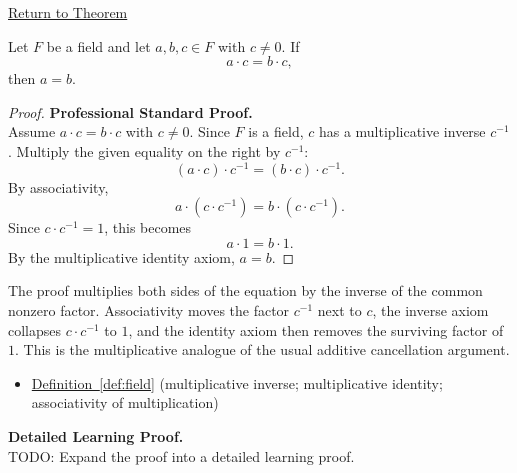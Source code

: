 \newpage
{}
\label{prf:multiplicative-cancellation}

\begin{remark*}[Return]
\hyperref[thm:multiplicative-cancellation]{Return to Theorem}
\end{remark*}

\begin{theorem*}
Let $F$ be a field and let $a,b,c\in F$ with $c\neq 0$.  If
\[
a\cdot c = b\cdot c,
\]
then $a = b$.
\end{theorem*}

\begin{proof}
\textbf{Professional Standard Proof.}~\\
Assume $a\cdot c=b\cdot c$ with $c\neq 0$.  Since $F$ is a field, $c$ has a
multiplicative inverse $c^{-1}$.  Multiply the given equality on the right by
$c^{-1}$:
\[
(a\cdot c)\cdot c^{-1}=(b\cdot c)\cdot c^{-1}.
\]
By associativity,
\[
a\cdot(c\cdot c^{-1})=b\cdot(c\cdot c^{-1}).
\]
Since $c\cdot c^{-1}=1$, this becomes
\[
a\cdot 1=b\cdot 1.
\]
By the multiplicative identity axiom, $a=b$.
\end{proof}

\begin{remark*}
The proof multiplies both sides of the equation by the inverse of the common
nonzero factor.  Associativity moves the factor $c^{-1}$ next to $c$, the
inverse axiom collapses $c\cdot c^{-1}$ to $1$, and the identity axiom then
removes the surviving factor of $1$.  This is the multiplicative analogue of
the usual additive cancellation argument.
\end{remark*}

\begin{dependencies}
\begin{itemize}
  \item \hyperref[def:field]{Definition~\ref*{def:field}}
        \textnormal{(multiplicative inverse; multiplicative identity; associativity of multiplication)}
\end{itemize}
\end{dependencies}

\textbf{Detailed Learning Proof.}~\\
TODO: Expand the proof into a detailed learning proof.

